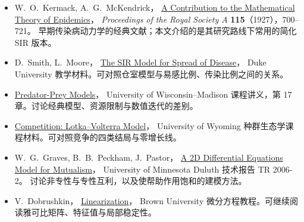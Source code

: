 \documentclass[UTF8,11pt,fontset=none]{ctexart}
\begin{document}
\begin{keybox}[参考与继续阅读]
\begin{itemize}
\item W.~O.~Kermack, A.~G.~McKendrick，
\href{https://doi.org/10.1098/rspa.1927.0118}{A Contribution to the Mathematical Theory of Epidemics}，
\textit{Proceedings of the Royal Society A} \textbf{115}（1927），700--721。
早期传染病动力学的经典文献；本文介绍的是其研究路线下常用的简化 SIR 版本。
\item D.~Smith, L.~Moore，
\href{https://sites.math.duke.edu/education/ccp/materials/diffcalc/sir/}{The SIR Model for Spread of Disease}，
Duke University 教学材料。可对照仓室模型与易感比例、传染比例之间的关系。
\item \href{https://users.ssc.wisc.edu/~jdmontgomery/predatorprey.pdf}{Predator-Prey Models}，
University of Wisconsin--Madison 课程讲义，第 17 章。讨论经典模型、资源限制与数值迭代的差别。
\item \href{https://www.uwyo.edu/dbmcd/popecol/marlects/lect21.html}{Competition: Lotka--Volterra Model}，
University of Wyoming 种群生态学课程材料。可对照竞争的四类结局与零增长线。
\item W.~G.~Graves, B.~B.~Peckham, J.~Pastor，
\href{https://www.d.umn.edu/~bpeckham/export/Papers/GPP_UMD_TR2006-2.pdf}{A 2D Differential Equations Model for Mutualism}，
University of Minnesota Duluth 技术报告 TR 2006-2。
讨论非专性与专性互利，以及使帮助作用饱和的建模方法。
\item V.~Dobrushkin，
\href{https://www.cfm.brown.edu/people/dobrush/am34/Mathematica/ch3/linear.html}{Linearization}，
Brown University 微分方程教程。可继续阅读雅可比矩阵、特征值与局部稳定性。
\end{itemize}
\end{keybox}
\end{document}
